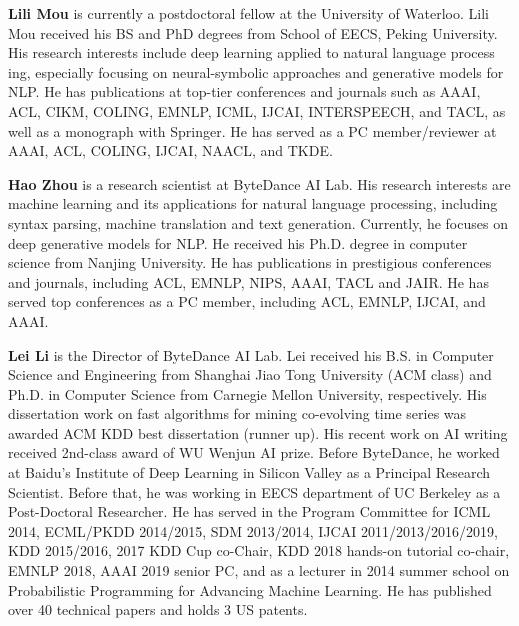 \begin{bio}

\textbf{Lili Mou} is currently a postdoctoral fellow at the University of Waterloo. Lili Mou received
his BS and PhD degrees from School of EECS, Peking University. His research interests include
deep learning applied to natural language process ing, especially focusing on neural-symbolic approaches and generative models for NLP. He has publications at top-tier conferences and journals such as AAAI, ACL, CIKM, COLING, EMNLP, ICML, IJCAI, INTERSPEECH, and TACL, as well as a monograph with Springer. He has served as a PC member/reviewer at AAAI, ACL, COLING, IJCAI, NAACL, and TKDE.


\textbf{Hao Zhou}  is a research scientist at ByteDance AI Lab. His research interests are machine learning and its applications for natural language processing, including syntax parsing, machine translation and text generation. Currently, he focuses on deep generative models for NLP. He received his Ph.D. degree in computer science from Nanjing University. He has publications in prestigious conferences and journals, including ACL, EMNLP, NIPS, AAAI, TACL and JAIR. He has served top conferences as a PC member, including ACL, EMNLP, IJCAI, and AAAI.


\textbf{Lei Li} is the Director of ByteDance AI Lab. Lei received his B.S. in Computer Science and Engineering from Shanghai Jiao Tong University (ACM class) and Ph.D. in Computer Science from Carnegie Mellon University, respectively. His dissertation work on fast algorithms for mining co-evolving time series was awarded ACM KDD best dissertation (runner up). His recent work on AI writing received 2nd-class award of WU Wenjun AI prize. Before ByteDance, he worked at Baidu’s Institute of Deep Learning in Silicon Valley as a Principal Research Scientist. Before that, he was working in EECS department of UC Berkeley as a Post-Doctoral Researcher. He has served in the Program Committee for ICML 2014, ECML/PKDD 2014/2015, SDM 2013/2014, IJCAI 2011/2013/2016/2019, KDD 2015/2016, 2017 KDD Cup co-Chair, KDD 2018 hands-on tutorial co-chair, EMNLP 2018, AAAI 2019 senior PC, and as a lecturer in 2014 summer school on Probabilistic Programming for Advancing Machine Learning. He has published over 40 technical papers and holds 3 US patents.


\end{bio}

